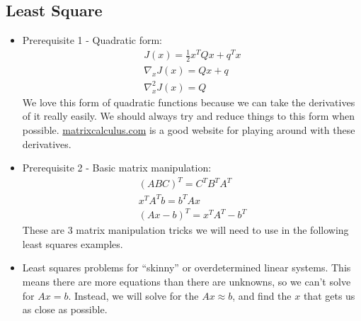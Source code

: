 \subsection*{Least Square}
\begin{itemize}
    \item Prerequisite 1 - Quadratic form:
    \begin{equation}
        \begin{gathered}
            J( x) =\frac{1}{2} x^{T} Qx+q^{T} x\\
            \nabla _{x} J( x) =Qx+q\\
            \nabla _{x}^{2} J( x) =Q
        \end{gathered}
    \end{equation}
    We love this form of quadratic functions because we can take the derivatives of it really easily. We should always try and reduce things to this form when possible. \url{matrixcalculus.com} is a good website for playing around with these derivatives.
    \item Prerequisite 2 - Basic matrix manipulation:
    \begin{equation}
            \begin{gathered}
                ( ABC)^{T} =C^{T} B^{T} A^{T}\\
                x^{T} A^{T} b=b^{T} Ax\\
                ( Ax-b)^{T} =x^{T} A^T-b^{T}
            \end{gathered}
    \end{equation}
    These are 3 matrix manipulation tricks we will need to use in the following least squares examples.
    \item Least squares problems for ``skinny'' or overdetermined linear systems. This means there are more equations than there are unknowns, so we can't solve for $Ax=b$. Instead, we will solve for the $Ax \approx b$, and find the $x$ that gets us as close as possible. 
    

\end{itemize}
